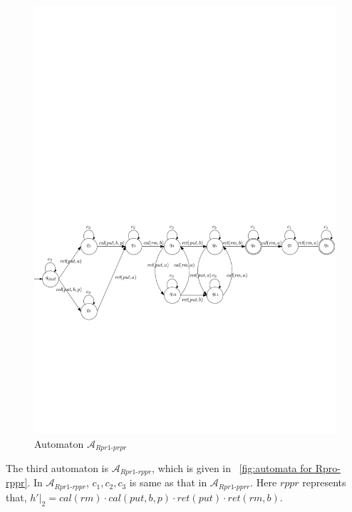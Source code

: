 \documentclass{llncs}
\begin{document}
\begin{figure}[htbp]
  \centering
  \includegraphics[width=1 \textwidth]{PIC_AUTO_UNMATCHED_Rpr1-prpr.pdf}
  \caption{Automaton $\mathcal{A}_{\textit{Rpr1-prpr}}$}
  \label{fig:automata for Rpro-prpr}
\end{figure}



The third automaton is $\mathcal{A}_{\textit{Rpr1-rppr}}$, which is given in \figurename~\ref{fig:automata for Rpro-rppr}. In $\mathcal{A}_{\textit{Rpr1-rppr}}$, $c_1, c_2, c_3$ is same as that in $\mathcal{A}_{\textit{Rpr1-pprr}}$. Here $\textit{rppr}$ represents that, $h' \vert_{2} = \textit{cal}(\textit{rm}) \cdot \textit{cal}(\textit{put},b,p) \cdot \textit{ret}(\textit{put}) \cdot \textit{ret}(\textit{rm},b)$.
\end{document}
